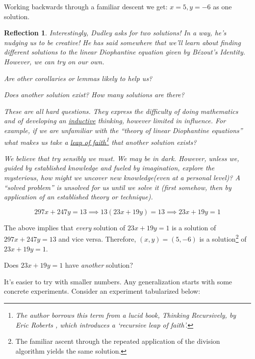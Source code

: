 \documentclass[english,notitlepage,smartquotes]{hgbreport}
\theoremstyle{definition}
\theoremstyle{remark}
\theoremstyle{plain}
\newtheorem{reflection}{Reflection}
\begin{document}
\begin{enumerate}[label=\textbf{\arabic*}.]
Working backwards through a familiar descent we get: $x=5,y=-6$ as one solution.
\begin{reflection}
Interestingly, Dudley asks for two solutions! In a way, he's nudging us to be creative! He has said somewhere that we'll learn about finding different solutions to the linear Diophantine equation given by B\'ezout's Identity. However, we can try on our own.

Are other corollaries or lemmas likely to help us?

Does another solution exist? How many solutions are there?

These are all hard questions. They express the difficulty of doing mathematics and of developing an \underline{inductive} thinking, however limited in influence. For example, if we are unfamiliar with the ``theory of linear Diophantine equations'' what makes us take a \underline{leap of faith}\footnote{The author borrows this term from a lucid book, \emph{Thinking Recursively}, by Eric Roberts \cite{Roberts1986}, which introduces a `recursive leap of faith'.} that another solution exists?

We believe that try sensibly we must. We may be in dark. However, unless we, guided by established knowledge and fueled by imagination, explore the mysterious, how might we uncover new knowledge(even at a personal level)? A ``solved problem'' is unsolved for us until we solve it (first somehow, then by application of an established theory or technique).
\end{reflection}

$$
297x+247y=13\implies 13(23x+19y)=13\implies 23x+19y=1
$$

The above implies that \emph{every} solution of $23x+19y=1$ is a solution of $297x+247y=13$ and vice versa. Therefore, $(x,y)=(5,-6)$ is a solution\footnote{The familiar ascent through the repeated application of the division algorithm yields the same solution.} of $23x+19y=1$.

Does $23x+19y=1$ have \emph{another} solution?

It's easier to try with smaller numbers. Any generalization starts with some concrete experiments. Consider an experiment tabularized below:


\end{enumerate}
\end{document}
